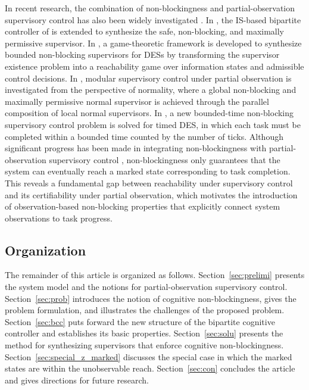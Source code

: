 \documentclass[journal,twoside,web]{ieeecolor}
\begin{document}
In recent research, the combination of non-blockingness and partial-observation supervisory control has also been widely investigated \cite{fokkink2024offline, hou2023distributed, zhang2024quantitatively}.
%
In \cite{yin2016synthesis}, the IS-based bipartite controller of \cite{yin2016uniform} is extended to synthesize the safe, non-blocking, and maximally permissive supervisor.
%
In \cite{xiang2024existence}, a game-theoretic framework is developed to synthesize bounded non-blocking supervisors for DESs by transforming the supervisor existence problem into a reachability game over information states and admissible control decisions.
%
In \cite{jan2024supervisory}, modular supervisory control under partial observation is investigated from the perspective of normality, where a global non-blocking and maximally permissive normal supervisor is achieved through the parallel composition of local normal supervisors.
%
In \cite{zhang2025bounded},  a new bounded-time non-blocking supervisory control problem is solved for timed DES, in which each task must be completed within a bounded time counted by the number of ticks.
%
Although significant progress has been made in integrating non-blockingness with partial-observation supervisory control \cite{fokkink2024offline, hou2023distributed, zhang2024quantitatively}, non-blockingness only guarantees that the system can eventually reach a marked state corresponding to task completion. 
This reveals a fundamental gap between reachability under supervisory control and its certifiability under partial observation, which motivates the introduction of observation-based non-blocking properties that explicitly connect system observations to task progress.


\subsection{Organization}

The remainder of this article is organized as follows.
%
Section~\ref{sec:prelimi} presents the system model and the notions for partial-observation supervisory control.
Section~\ref{sec:prob} introduces the notion of cognitive non-blockingness, gives the problem formulation, and illustrates the challenges of the proposed problem.
Section~\ref{sec:bcc} puts forward the new structure of the  bipartite cognitive controller and establishes its basic properties.
Section~\ref{sec:solu} presents the method for synthesizing supervisors that enforce cognitive non-blockingness.
Section~\ref{sec:special_z_marked} discusses the special case in which the marked states are within the unobservable reach.
Section~\ref{sec:con} concludes the article and gives directions for future research.
\end{document}
